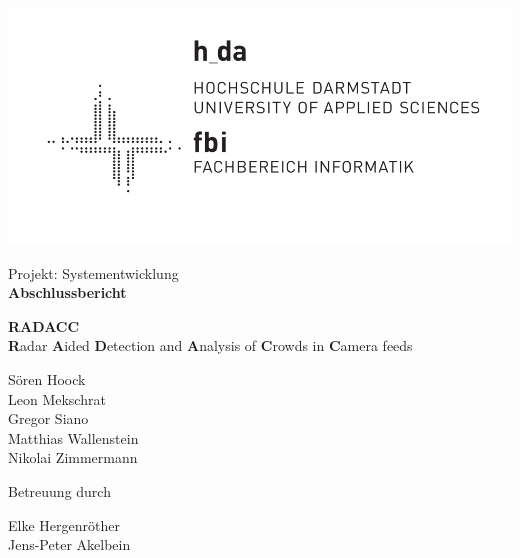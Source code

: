 \documentclass[report]{scrartcl}
\begin{document}
\begin{titlepage}
  \begin{center}
    \includegraphics[]{fbilogo-2.png}
    \vspace*{1cm}

    \Large

    Projekt: Systementwicklung \\
    \textbf{Abschlussbericht} \\

    \vspace{0.5cm}
    \normalsize

    \vspace{7cm}

    \vspace{0.2cm}
    \large
    \textbf{RADACC} \\

    \small{\textbf{R}adar \textbf{A}ided \textbf{D}etection and \textbf{A}nalysis of \textbf{C}rowds in \textbf{C}amera feeds}

    \vspace{1.8cm}

    \normalsize
    Sören Hoock \\
    Leon Mekschrat \\
    Gregor Siano \\
    Matthias Wallenstein \\
    Nikolai Zimmermann

    \vspace{4.cm}

    \small{Betreuung durch}

    Elke Hergenröther \\
    Jens-Peter Akelbein

  \end{center}
\end{titlepage}

%
\thispagestyle{empty}
\newpage
{\hypersetup{linkcolor=black}
  \tableofcontents
}
\end{document}
